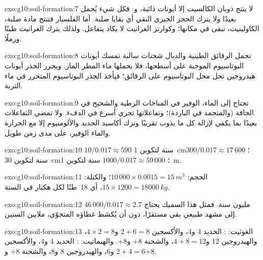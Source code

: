 \begin{solution}{exo:g10:soil-formation:7}
لا ينتج ذوبان الكالسيت إلا أيونات ذائبة، 
و: فكل شيء يُحمل بعيدًا ولا يترك الحجر الجيري النقي أي بقايا صلبة. أما
 الفلسبار فتنتج مادة صلبة، الكاولينيت، تبقى في مكانها؛ وكوارتز الغرانيت لا يكاد
يتفاعل. ولذلك يترك الغرانيت طينًا ورملًا.
\end{solution}

\begin{solution}{exo:g10:soil-formation:8}
تحمل الرقائق الطينية والدبال شحنات سالبة تمسك أيونات البوتاسيوم الموجبة  على
أسطحها، فلا يحملها ماء المطر المار. ويحرر الجذر أيونات هيدروجين تحل محل البوتاسيوم
على الرقائق؛ فيأخذ الجذر البوتاسيوم المتحرر في ماء
التربة.
\end{solution}

\begin{solution}{exo:g10:soil-formation:9}
تحتاج  إلى الماء، الوفير في المناخات الرطبة والشحيح في الجافة
(والمتجمد في الباردة)؛ وتفاعلاتها تجري أسرع في الدفء. ولا تمضي التفاعلات بعيدًا بما
يكفي لإزالة كل ما يذوب تقريبًا وترك أكاسيد الحديد والألومنيوم إلا مع الحرارة والماء
الوفير، على مدى زمن طويل.
\end{solution}

\begin{solution}{exo:g10:soil-formation:10}
$10/0.017 \approx 590$ سنة لتكوين \qty{1}{cm}؛ $300/0.017 \approx 17\,600$
سنة لتكوين \qty{30}{cm}؛ $1000/0.017 \approx 59\,000$ سنة لتكوين \qty{1}{m}.
\end{solution}

\begin{solution}{exo:g10:soil-formation:11}
الحجم: $10\,000 \times 0.0015 = \qty{15}{m^3}$؛ والكتلة: $15 \times 1200 =
\qty{18000}{kg}$، أي \num{18}~طنًا لكل هكتار في السنة.
\end{solution}

\begin{solution}{exo:g10:soil-formation:12}
$46\,000/0.017 \approx 2.7$ مليون سنة. فمثل هذا  السميك يحتاج إلى مشهد
طبيعي بقي مستقرًا، دون أن يُكشط غطاؤه المتجوّي، ملايين السنين.
\end{solution}

\begin{solution}{exo:g10:soil-formation:13}
الغوثيت: : الحديد 4 و4،
والأكسجين $2 + 6 = 8$ و$4 \times 2 = 8$، والهيدروجين 12 و$4 + 8 = 12$، والشحنة
$+8$ و$+8$. والهيماتيت: : الحديد 4
و4، والأكسجين $2 + 4 = 6$ و6، والهيدروجين 8 و8، والشحنة $+8$ و$+8$.
\end{solution}

